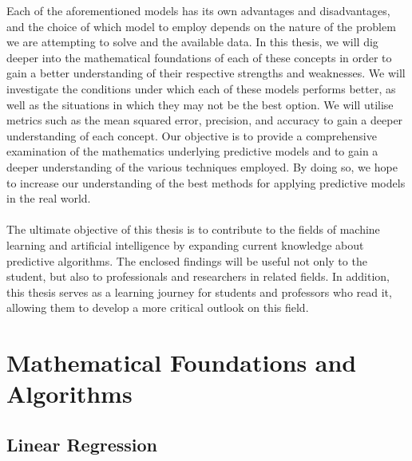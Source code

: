 \documentclass{article}[12pt]
\theoremstyle{definition}
\begin{document}
Each of the aforementioned models has its own advantages and disadvantages, and the choice of which model to employ depends on the nature of the problem we are attempting to solve and the available data. In this thesis, we will dig deeper into the mathematical foundations of each of these concepts in order to gain a better understanding of their respective strengths and weaknesses. We will investigate the conditions under which each of these models performs better, as well as the situations in which they may not be the best option. We will utilise metrics such as the mean squared error, precision, and accuracy to gain a deeper understanding of each concept. Our objective is to provide a comprehensive examination of the mathematics underlying predictive models and to gain a deeper understanding of the various techniques employed. By doing so, we hope to increase our understanding of the best methods for applying predictive models in the real world.
\\
\\
The ultimate objective of this thesis is to contribute to the fields of machine learning and artificial intelligence by expanding current knowledge about predictive algorithms. The enclosed findings will be useful not only to the student, but also to professionals and researchers in related fields. In addition, this thesis serves as a learning journey for students and professors who read it, allowing them to develop a more critical outlook on this field.

\newpage

\bigskip

\section{Mathematical Foundations and Algorithms}

\bigskip

\subsection{Linear Regression}

\bigskip
\end{document}
